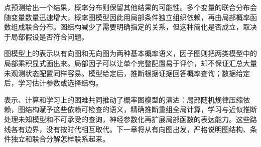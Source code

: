 点预测给出一个结果，概率分布则保留其他结果的可能性。多个变量的联合分布会随变量数量迅速增大，概率图模型因此用局部条件独立组织依赖，再由局部概率函数组成联合分布。图结构减少了需要明确指定的关系，但这种简化是否成立，取决于局部假设是否符合问题。

图模型上的表示以有向图和无向图为两种基本概率语义，因子图则把两类模型中的局部乘积显式画出来。局部因子可以让单个完整配置易于评价，却不保证汇总大量未观测状态配置同样容易。模型给定后，推断根据证据回答概率查询；数据给定后，学习估计参数或选择结构。

表示、计算和学习上的困难共同推动了概率图模型的演进：局部随机规律压缩依赖，图结构赋予这些依赖可检查的语义，精确推断重组全局计算，学习与近似推断处理未知模型和不可承受的查询，神经参数化再扩展局部函数的表达能力。这些路线各有边界，没有按时代相互取代。下一章将从有向图出发，严格说明图结构、条件独立和联合分解怎样联系起来。
